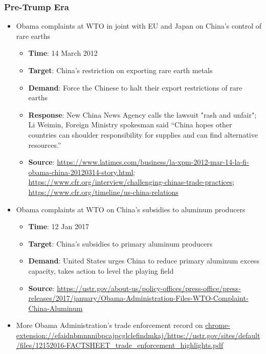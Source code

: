		\subsubsection{Pre-Trump Era}
			\begin{itemize}
			\item	Obama complaints at WTO in joint with EU and Japan on China's control of rare earths
				\begin{itemize}
				\item	\textbf{Time}: 14 March 2012
				\item \textbf{Target}: China's restriction on exporting rare earth metals
				\item \textbf{Demand}: Force the Chinese to halt their export restrictions of rare earths
				\item \textbf{Response}: New China News Agency calls the lawsuit "rash and unfair"; Li Weimin, Foreign Ministry spokesman said  “China hopes other countries can shoulder responsibility for supplies and can find alternative resources.”
				\item \textbf{Source}: \url{https://www.latimes.com/business/la-xpm-2012-mar-14-la-fi-obama-china-20120314-story.html}; \url{https://www.cfr.org/interview/challenging-chinas-trade-practices}; \url{https://www.cfr.org/timeline/us-china-relations}
				\end{itemize}
				
			\item Obama complaints at WTO on China's subsidies to aluminum producers
				\begin{itemize}
				\item	\textbf{Time}: 12 Jan 2017
				\item \textbf{Target}: China's subsidies to primary aluminum producers
				\item \textbf{Demand}: United States urges China to reduce primary aluminum excess capacity, takes action to level the playing field
				\item \textbf{Source}: \url{https://ustr.gov/about-us/policy-offices/press-office/press-releases/2017/january/Obama-Administration-Files-WTO-Complaint-China-Aluminum}
				\end{itemize}
			\item More Obama Administration's trade enforcement record on \url{chrome-extension://efaidnbmnnnibpcajpcglclefindmkaj/https://ustr.gov/sites/default/files/12152016-FACTSHEET_trade_enforcement_highlights.pdf}
			
			\end{itemize}
		
